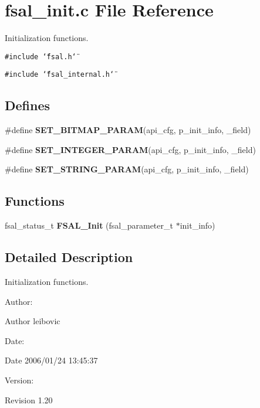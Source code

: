 \section{fsal\_\-init.c File Reference}
\label{fsal__init_8c}
Initialization functions. 

{\tt \#include \char`\"{}fsal.h\char`\"{}}\par
{\tt \#include \char`\"{}fsal\_\-internal.h\char`\"{}}\par
\subsection*{Defines}
\begin{CompactItemize}
\item 
\#define {\bf SET\_\-BITMAP\_\-PARAM}(api\_\-cfg, p\_\-init\_\-info, \_\-field)
\item 
\#define {\bf SET\_\-INTEGER\_\-PARAM}(api\_\-cfg, p\_\-init\_\-info, \_\-field)
\item 
\#define {\bf SET\_\-STRING\_\-PARAM}(api\_\-cfg, p\_\-init\_\-info, \_\-field)
\end{CompactItemize}
\subsection*{Functions}
\begin{CompactItemize}
\item 
fsal\_\-status\_\-t {\bf FSAL\_\-Init} (fsal\_\-parameter\_\-t $\ast$init\_\-info)
\end{CompactItemize}


\subsection{Detailed Description}
Initialization functions. 

\begin{Desc}
\item[Author:]\begin{Desc}
\item[Author]leibovic \end{Desc}
\end{Desc}
\begin{Desc}
\item[Date:]\begin{Desc}
\item[Date]2006/01/24 13:45:37 \end{Desc}
\end{Desc}
\begin{Desc}
\item[Version:]\begin{Desc}
\item[Revision]1.20 \end{Desc}
\end{Desc}


